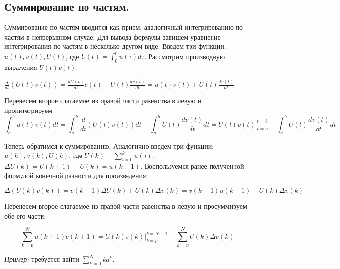 \documentclass[../../calc-math-exam-2023.tex]{subfiles}
\begin{document}
    \subsection{Суммирование по частям.}
    Суммирование по частям вводится как прием, аналогичный интегрированию по частям в непрерывном случае.
    Для вывода формулы запишем уравнение интегрирования по частям в несколько другом виде.
    Введем три функции: $\displaystyle u(t), v(t), U(t)$, где $\displaystyle U(t) = \int_{0}^{t}u(\tau)d\tau$.
    Рассмотрим производную выражения $U(t)v(t)$:

    $\displaystyle \frac{d}{dt}\left(U(t)v(t)\right) = \frac{dU(t)}{dt}v(t) + U(t)\frac{dv(t)}{dt} = u(t)v(t) + U(t)\frac{dv(t)}{dt}$
    \vspace{5pt}

    Перенесем второе слагаемое из правой части равенства в левую и проинтегрируем
    \begin{equation*}
        \int_a^b u(t)v(t)dt = \int_a^b \frac{d}{dt}\left(U(t)v(t)\right)dt - \int_a^b U(t) \frac{dv(t)}{dt}dt = U(t)v(t) \biggr\rvert_{t=a}^{t=b} - \int_a^b U(t)\frac{dv(t)}{dt}dt
    \end{equation*}

    Теперь обратимся к суммированию. Аналогично введем три функции: $\displaystyle u(k), v(k), U(k)$, где $\displaystyle U(k) = \sum_{i=0}^k u(i)$. $\displaystyle \Delta U(k) = U(k+1) - U(k) = u(k+1)$.
    Воспользуемся ранее полученной формулой конечной разности для произведения:

    $\displaystyle \Delta \left(U(k)v(k)\right) = v(k+1) \Delta U(k) + U(k)\Delta v(k) = v(k+1)u(k+1) + U(k)\Delta v(k)$

    Перенесем второе слагаемое из правой части равенства в левую и просуммируем обе его части:

    \begin{theorem}
        \begin{equation}
            \sum_{k=p}^N u(k+1)v(k+1) = U(k)v(k) \bigg\rvert_{k=p}^{k=N+1} - \sum_{k=p}^N U(k) \Delta v(k)\label{eq:abel}
        \end{equation}
    \end{theorem}

    \emph{Пример:} требуется найти $\displaystyle \sum_{k=0}^N ka^k$.
\end{document}
